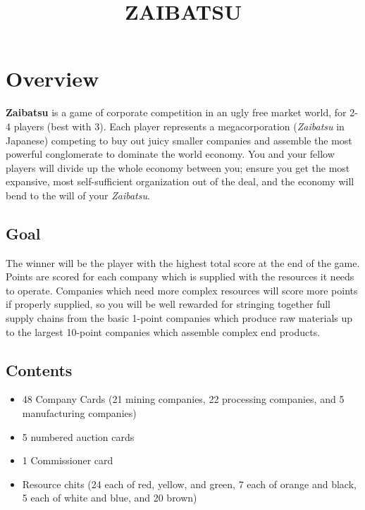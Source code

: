 \documentclass[]{article}
\title{ZAIBATSU}
\date{}
\newcommand{\tyen}{T\textyen}
\begin{document}
\maketitle

\section*{Overview}

\textbf{Zaibatsu} is a game of corporate competition in an ugly free market world, for 2-4 players (best with 3). Each player represents a megacorporation (\textit{Zaibatsu} in Japanese) competing to buy out juicy smaller companies and assemble the most powerful conglomerate to dominate the world economy. You and your fellow players will divide up the whole economy between you; ensure you get the most expansive, most self-sufficient organization out of the deal, and the economy will bend to the will of your \emph{Zaibatsu}.

\subsection*{Goal}

The winner will be the player with the highest total score at the end of the game. Points are scored for each company which is supplied with the resources it needs to operate. Companies which need more complex resources will score more points if properly supplied, so you will be well rewarded for stringing together full supply chains from the basic 1-point companies which produce raw materials up to the largest 10-point companies which assemble complex end products.

\subsection*{Contents}

\begin{itemize}
\item 48 Company Cards (21 mining companies, 22 processing companies, and 5 manufacturing companies)
\item 5 numbered auction cards
\item 1 Commissioner card
\item Resource chits (24 each of red, yellow, and green, 7 each of orange and black, 5 each of white and blue, and 20 brown)
\end{itemize}
\end{document}
